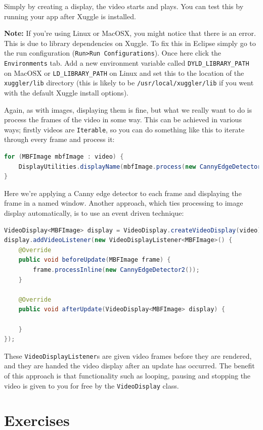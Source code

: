 \documentclass[10pt,a4paper,twoside,extrafontsizes]{memoir}
\begin{document}
Simply by creating a display, the video starts and plays. You can test this by running 
your app after Xuggle is installed. 

\textbf{Note:} If you're using Linux or MacOSX, you might notice that there is an error. 
This is due to library dependencies on Xuggle. To fix this in Eclipse simply go to the run configuration 
(\verb+Run>Run Configurations+). Once here click the \verb+Environments+ tab. Add a new environment 
variable called \verb+DYLD_LIBRARY_PATH+ on MacOSX or \verb+LD_LIBRARY_PATH+ on Linux and set this to 
the location of the \verb+xuggler/lib+ directory (this is likely to be \verb+/usr/local/xuggler/lib+
if you went with the default Xuggle install options).

Again, as with images, displaying them is fine, but what we really want to do is process the frames of 
the video in some way. This can be achieved in various ways; firstly videos are \verb+Iterable+, so you can 
do something like this to iterate through every frame and process it:
\begin{lstlisting}[language=java]
for (MBFImage mbfImage : video) {
    DisplayUtilities.displayName(mbfImage.process(new CannyEdgeDetector2()), "videoFrames");
}
\end{lstlisting}
Here we're applying a Canny edge detector to each frame and displaying the frame in a named window. Another 
approach, which ties processing to image display automatically, is to use an event driven technique:
\begin{lstlisting}[language=java]
VideoDisplay<MBFImage> display = VideoDisplay.createVideoDisplay(video);
display.addVideoListener(new VideoDisplayListener<MBFImage>() {
    @Override
    public void beforeUpdate(MBFImage frame) {
        frame.processInline(new CannyEdgeDetector2());
    }

    @Override
    public void afterUpdate(VideoDisplay<MBFImage> display) {

    }
});
\end{lstlisting}

These \verb+VideoDisplayListener+s are given video frames before they are rendered, and they are handed the 
video display after an update has occurred. The benefit of this approach is that functionality such as 
looping, pausing and stopping the video is given to you for free by the \verb+VideoDisplay+ class. 

\section*{Exercises}
\end{document}
